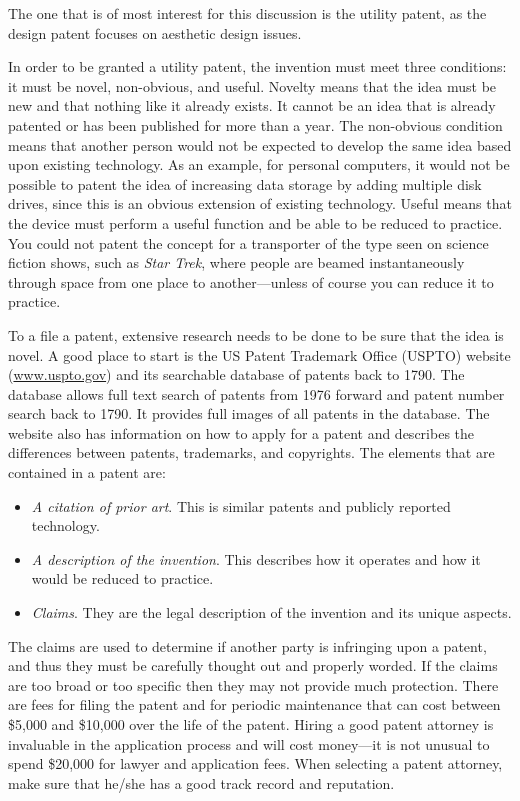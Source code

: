 The one that is of most interest for this discussion is the utility
patent, as the design patent focuses on aesthetic design issues.

In order to be granted a utility patent, the invention must meet three
conditions: it must be novel, non-obvious, and useful. Novelty means
that the idea must be new and that nothing like it already exists. It
cannot be an idea that is already patented or has been published for
more than a year. The non-obvious condition means that another person
would not be expected to develop the same idea based upon existing
technology. As an example, for personal computers, it would not be
possible to patent the idea of increasing data storage by adding
multiple disk drives, since this is an obvious extension of existing
technology. Useful means that the device must perform a useful function
and be able to be reduced to practice. You could not patent the concept
for a transporter of the type seen on science fiction shows, such as
\emph{Star Trek}, where people are beamed instantaneously through space
from one place to another---unless of course you can reduce it to
practice.

To a file a patent, extensive research needs to be done to be sure that
the idea is novel. A good place to start is the US Patent Trademark
Office (USPTO) website (\href{http://www.uspto.gov}{www.uspto.gov}) and
its searchable database of patents back to 1790. The database allows
full text search of patents from 1976 forward and patent number search
back to 1790. It provides full images of all patents in the database.
The website also has information on how to apply for a patent and
describes the differences between patents, trademarks, and copyrights.
The elements that are contained in a patent are:

\begin{itemize}
\item
  \emph{A citation of prior art}. This is similar patents and publicly
  reported technology.
\item
  \emph{A description of the invention}. This describes how it operates
  and how it would be reduced to practice.
\item
  \emph{Claims}. They are the legal description of the invention and its
  unique aspects.
\end{itemize}

The claims are used to determine if another party is infringing upon a
patent, and thus they must be carefully thought out and properly worded.
If the claims are too broad or too specific then they may not provide
much protection. There are fees for filing the patent and for periodic
maintenance that can cost between \$5,000 and \$10,000 over the life of
the patent. Hiring a good patent attorney is invaluable in the
application process and will cost money---it is not unusual to spend
\$20,000 for lawyer and application fees. When selecting a patent
attorney, make sure that he/she has a good track record and reputation.

